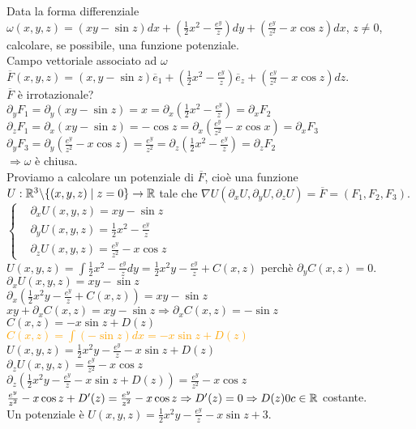 \begin{exbar}
\begin{example}
	Data la forma differenziale $\omega(x,y,z)=(xy-\sin z)dx +\left(\frac{1}{2}x^2-\frac{e^y}{z} \right)dy+\left( \frac{e^y}{z^2}-x\cos z \right)dx$, $z \neq 0$, calcolare, se possibile, una funzione potenziale.\\
	Campo vettoriale associato ad $\omega$\\
	$\overline{F}(x,y,z)=(x,y-\sin z)\overline{e}_1+\left( \frac{1}{2}x^2-\frac{e^y}{z} \right) \overline{e}_z+\left( \frac{e^y}{z^2}-x\cos z \right)dz$.\\
	$\overline{F}$ è irrotazionale?\\
	$\partial_yF_1=\partial_y(xy-\sin z)=x=\partial_x\left( \frac{1}{2}x^2-\frac{e^y}{z} \right)= \partial_xF_2$\\
	$\partial_z F_1 =\partial_x (xy-\sin z)= -\cos z = \partial_x\left( \frac{e^y}{z^2}-x\cos x \right)=\partial_x F_3$\\
	$\partial_yF_3=\partial_y\left( \frac{e^y}{z^2}-x\cos z \right)= \frac{e^y}{z^2}=\partial_z\left( \frac{1}{2}x^2-\frac{e^y}{z} \right)=\partial_zF_2$\\
	$\Rightarrow \omega$ è chiusa.\\
	Proviamo a calcolare un potenziale di $\overline{F}$, cioè una funzione $U:\mathbb{R}^3\backslash \{(x,y,z)\mid z=0\}\rightarrow \mathbb{R}$ tale che $\nabla U(\partial_xU,\partial_yU,\partial_zU)=\overline{F}=(F_1,F_2,F_3)$.\\
	$\begin{cases}
		&\partial_xU(x,y,z)=xy-\sin z\\
		&\partial_y U(x,y,z)=\frac{1}{2}x^2-\frac{e^y}{z}\\
		&\partial_z U(x,y,z)=\frac{e^y}{z^2}-x\cos z
	\end{cases}$\\
	$U(x,y,z)=\int \frac{1}{2} x^2 -\frac{e^y}{z}dy=\frac{1}{2}x^2y-\frac{e^y}{z}+C(x,z)$ perchè $\partial_y C(x,z)=0$.\\
	$\partial_xU(x,y,z)=xy-\sin z$\\
	$\partial_x\left( \frac{1}{2}x^2y-\frac{e^y}{z}+C(x,z) \right)=xy-\sin z$\\$xy+\partial_xC(x,z)=xy-\sin z \Rightarrow \partial_xC(x,z)=-\sin z$\\
	$C(x,z)=-x\sin z + D(z)$\\
	\textcolor{orange}{$C(x,z)=\int (-\sin z)dx=-x\sin z+D(z)$}\\
	$U(x,y,z)=\frac{1}{2}x^2y-\frac{e^y}{z}-x\sin z+D(z)$\\
	$\partial_z U(x,y,z)=\frac{e^y}{z^2}-x\cos z$\\
	$\partial_z\left( \frac{1}{2}x^2y-\frac{e^y}{z}-x\sin z + D(z) \right)=\frac{e^y}{z^2}-x\cos z$\\
	$\frac{e^y}{z^2}-x\cos z+ D'(z)=\frac{e^y}{z^2}-x\cos z\Rightarrow D'(z)=0\Rightarrow D(z)0c \in \mathbb{R}$ costante.\\
	Un potenziale è $U(x,y,z)=\frac{1}{2}x^2y-\frac{e^y}{z}-x\sin z +3$.
\end{example}
\end{exbar}


